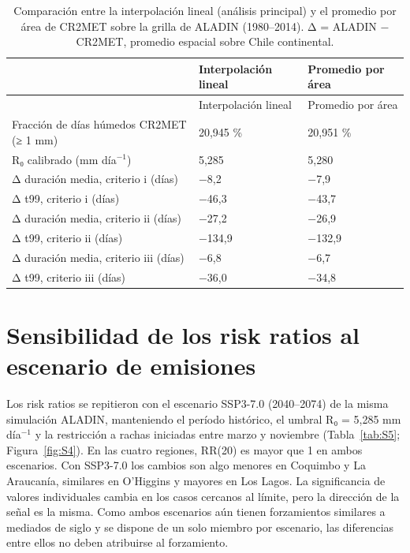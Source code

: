 \begin{longtable}[]{@{}lll@{}}
\caption[Comparación entre la interpolación lineal (análisis principal) y el promedio por área de CR2MET sobre la grilla de ALADIN (1980--2014)]{Comparación entre la interpolación lineal (análisis principal) y el promedio por área de CR2MET sobre la grilla de ALADIN (1980--2014). Δ = ALADIN − CR2MET, promedio espacial sobre Chile continental.}\label{tab:S4}\tabularnewline
\toprule\noalign{}
& Interpolación lineal & Promedio por área \\
\midrule\noalign{}
\endfirsthead
\toprule\noalign{}
& Interpolación lineal & Promedio por área \\
\midrule\noalign{}
\endhead
\bottomrule\noalign{}
\endlastfoot
Fracción de días húmedos CR2MET (≥ 1 mm) & 20,945 \% & 20,951 \% \\
R₀ calibrado (mm día$^{-1}$) & 5,285 & 5,280 \\
Δ duración media, criterio i (días) & −8,2 & −7,9 \\
Δ t99, criterio i (días) & −46,3 & −43,7 \\
Δ duración media, criterio ii (días) & −27,2 & −26,9 \\
Δ t99, criterio ii (días) & −134,9 & −132,9 \\
Δ duración media, criterio iii (días) & −6,8 & −6,7 \\
Δ t99, criterio iii (días) & −36,0 & −34,8 \\
\end{longtable}

\section{Sensibilidad de los risk ratios al escenario de emisiones}\label{sec:S6}

Los risk ratios se repitieron con el escenario SSP3-7.0 (2040--2074) de la misma simulación ALADIN, manteniendo el período histórico, el umbral R₀ = 5,285 mm día$^{-1}$ y la restricción a rachas iniciadas entre marzo y noviembre (Tabla~\ref{tab:S5}; Figura~\ref{fig:S4}). En las cuatro regiones, RR(20) es mayor que 1 en ambos escenarios. Con SSP3-7.0 los cambios son algo menores en Coquimbo y La Araucanía, similares en O'Higgins y mayores en Los Lagos. La significancia de valores individuales cambia en los casos cercanos al límite, pero la dirección de la señal es la misma. Como ambos escenarios aún tienen forzamientos similares a mediados de siglo y se dispone de un solo miembro por escenario, las diferencias entre ellos no deben atribuirse al forzamiento.

